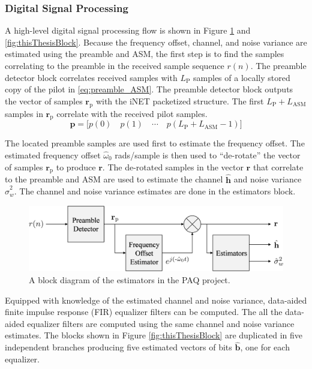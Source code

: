 \subsubsection{Digital Signal Processing}
\label{sec:signalProcessing}
A high-level digital signal processing flow is shown in Figure \ref{fig:estimators} and \ref{fig:thisThesisBlock}.
Because the frequency offset, channel, and noise variance are estimated using the preamble and ASM, the first step is to find the samples correlating to the preamble in the received sample sequence $r(n)$.
The preamble detector block correlates received samples with $L_\text{P}$ samples of a locally stored copy of the pilot in \eqref{eq:preamble_ASM}.
The preamble detector block outputs the vector of samples $\mathbf{r}_\text{p}$ with the iNET packetized structure.
The first $L_\text{P} + L_\text{ASM}$ samples in $\mathbf{r}_\text{p}$ correlate with the received pilot samples.
\begin{equation}
\mathbf{p} = \big[ p(0) \quad p(1) \quad \cdots  \quad  p(L_\text{P} + L_\text{ASM}-1) \big]
\label{eq:preamble_ASM}
\end{equation}

The located preamble samples are used first to estimate the frequency offset.
The estimated frequency offset $\hat{\omega}_0$ rads/sample is then used to ``de-rotate'' the vector of samples $\mathbf{r}_\text{p}$ to produce $\mathbf{r}$.
The de-rotated samples in the vector $\mathbf{r}$ that correlate to the preamble and ASM are used to estimate the channel $\hat{\mathbf{h}}$ and noise variance $\hat{\sigma}^2_w$.
The channel and noise variance estimates are done in the estimators block.
\begin{figure}
	\centering\includegraphics[width=8.75in/100*55]{figures/intro/estimators.pdf}
	\caption{A block diagram of the estimators in the PAQ project.}
	\label{fig:estimators}
\end{figure}

Equipped with knowledge of the estimated channel and noise variance, data-aided finite impulse response (FIR) equalizer filters can be computed.
The all the data-aided equalizer filters are computed using the same channel and noise variance estimates.
The blocks shown in Figure \ref{fig:thisThesisBlock} are duplicated in five independent branches producing five estimated vectors of bits $\hat{\mathbf{b}}$, one for each equalizer.

